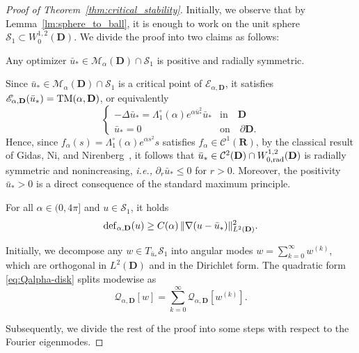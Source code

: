 \documentclass[reqno,11pt]{amsart}
\theoremstyle{definition}
\begin{document}
\begin{proof}[Proof of Theorem~\ref{thm:critical_stability}]
Initially, we observe that by Lemma~\ref{lm:sphere_to_ball}, it is enough to work on the unit sphere $\mathcal{S}_1\subset W^{1,2}_0(\mathbf{D})$.
We divide the proof into two claims as follows:

 Any optimizer $\bar{u}_*\in \mathcal{M}_{\alpha}(\mathbf{D})\cap\mathcal{S}_1$ is positive and radially symmetric.

\noindent Since $\bar{u}_*\in \mathcal{M}_{\alpha}(\mathbf{D})\cap\mathcal{S}_1$ is a critical point of $\mathscr{E}_{\alpha,\mathbf{D}}$, it satisfies $\mathscr{E}_{\alpha,\mathbf{D}}(\bar{u}_*)={\rm TM}(\alpha,\mathbf{D})$, or equivalently
\begin{equation}\label{euler_lag_eqn_disk}
		 \begin{cases}
			-\Delta \bar{u}_*  = \Lambda_1^{\circ}(\alpha)  e^{\alpha \bar{u}_{*}^2} \bar{u}_* & \mbox{in} \quad \mathbf{D}\\
			\bar{u}_*=0 & \mbox{on} \quad\partial \mathbf{D}.
		\end{cases} 
	\end{equation}
Hence, since $f_\alpha(s)=\Lambda_1^{\circ}(\alpha)  e^{\alpha s^2} s$ satisfies $f_\alpha\in \mathcal{C}^1(\mathbf{R})$, by the classical result of Gidas, Ni, and Nirenberg~\cite[Theorem~1]{MR634248}, it follows that $\bar{u}_*\in \mathcal{C}^2(\mathbf{D})\cap W^{1,2}_{0,{\rm rad}}(\mathbf{D})$ is radially symmetric and nonincreasing, {\it i.e.,} $\partial_r \bar{u}_*\leq 0$ for $r>0$. 
Moreover, the positivity $\bar{u}_*>0$ is a direct consequence of the standard maximum principle.

 For all $\alpha\in(0,4\pi]$ and $u\in\mathcal{S}_1$, it holds
\[
{\rm def}_{\alpha,\mathbf{D}}(u) \ge C(\alpha)\,\|\nabla(u-\bar{u}_*)\|_{L^2(\mathbf{D})}^2.
\]

\noindent Initially, we decompose any $w\in T_{\bar u_*}\mathcal{S}_1$ into angular modes
$w=\sum_{k=0}^\infty w^{(k)}$, which are orthogonal in $L^2(\mathbf{D})$ and in the Dirichlet form.
The quadratic form \eqref{eq:Qalpha-disk} splits modewise as
\[
\mathscr{Q}_{\alpha,\mathbf{D}}[w]=\sum_{k=0}^\infty\mathscr{Q}_{\alpha,\mathbf{D}}[w^{(k)}].
\]

Subsequently, we divide the rest of the proof into some steps with respect to the Fourier eigenmodes. 


\end{proof}
\end{document}
